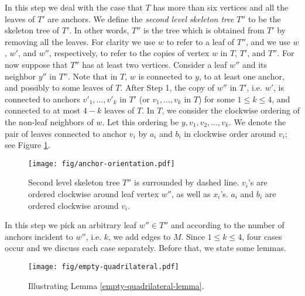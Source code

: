 \documentclass[11pt,a4paper]{article}
\begin{document}
In this step we deal with the case that $T$ has more than six vertices and all the leaves of $T'$ are anchors. We define the {\em second level skeleton tree} ${T''}$ to be the skeleton tree of $T'$. In other words, $T''$ is the tree which is obtained from $T'$ by removing all the leaves. For clarity we use $w$ to refer to a leaf of $T''$, and we use $w$, $w'$, and $w''$, respectively, to refer to the copies of vertex $w$ in $T$, $T'$, and $T''$. For now suppose that $T''$ has at least two vertices. Consider a leaf $w''$ and its neighbor $y''$ in $T''$. Note that in $T$, $w$ is connected to $y$, to at least one anchor, and possibly to some leaves of $T$. After Step 1, the copy of $w''$ in $T'$, i.e. $w'$, is connected to anchors $v'_1,\dots,v'_k$ in $T'$ (or $v_1,\dots,v_k$ in $T$) for some $1 \le k \le 4$, and connected to at most $4-k$ leaves of $T$. In $T$, we consider the clockwise ordering of the non-leaf neighbors of $w$. Let this ordering be $y, v_1, v_2, \dots, v_k$. We denote the pair of leaves connected to anchor $v_i$ by $a_i$ and $b_i$ in clockwise order around $v_i$; see Figure \ref{anchor-orientation}. 

\begin{figure}[ht]
  \centering
    \texttt{[image: fig/anchor-orientation.pdf]}
  \caption{Second level skeleton tree $T''$ is surrounded by dashed line. $v_i$'s are ordered clockwise around leaf vertex $w''$, as well as $x_i$'s. $a_i$ and $b_i$ are ordered clockwise around $v_i$.}
\label{anchor-orientation}
\end{figure}

In this step we pick an arbitrary leaf $w''\in T''$ and according to the number of anchors incident to $w''$, i.e. $k$, we 
add edges to $M$. Since $1 \le k \le 4$, four cases occur and we discuss each case separately. Before that, we state some lemmas.

\begin{figure}[ht]
  \centering
    \texttt{[image: fig/empty-quadrilateral.pdf]}
  \caption{Illustrating Lemma \ref{empty-quadrilateral-lemma}.}
\label{empty-quadrilateral-fig}
\end{figure}
\end{document}

